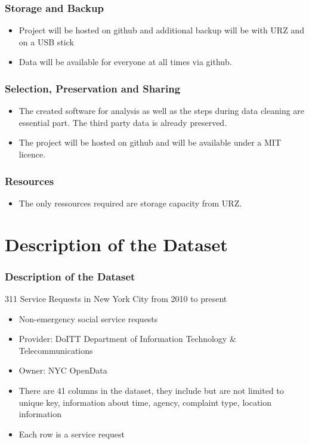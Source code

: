 \documentclass{beamer}
\begin{document}
\begin{frame}
\frametitle{Storage and Backup}
\begin{itemize}
\item Project will be hosted on github and additional backup will be with URZ and on a USB stick
\vfill
\item Data will be available for everyone at all times via github.
\end{itemize}
\end{frame}
\begin{frame}
\frametitle{Selection, Preservation and Sharing}
\begin{itemize}
\item The created software for analysis as well as the steps during data cleaning are essential part. The third party data is already preserved.
\vfill
\item The project will be hosted on github and will be available under a MIT licence.
\end{itemize}
\end{frame}
\begin{frame}
\frametitle{Resources}
\begin{itemize}
\item The only ressources required are storage capacity from URZ.
\end{itemize}
\end{frame}
\section{Description of the Dataset}
\begin{frame}
\frametitle{Description of the Dataset}
311 Service Requests in New York City from 2010 to present
\vfill
\begin{itemize}
\item Non-emergency social service requests
\vfill
\item Provider: DoITT Department of Information Technology \& Telecommunications
\vfill
\item Owner: NYC OpenData
\vfill
\item There are 41 columns in the dataset, they include but are not limited to unique key, information about time, agency, complaint type, location information
\item Each row is a service request
\end{itemize}
\end{frame}
\end{document}
